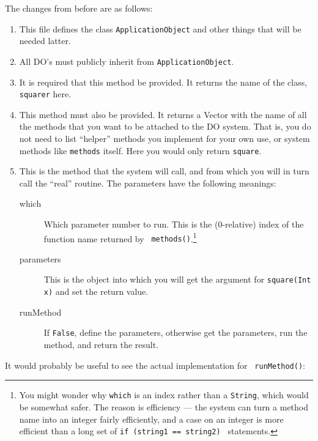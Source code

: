 The changes from before are as follows:
\begin{enumerate}
    \item This file defines the class {\tt ApplicationObject} and
          other things that will be needed latter.
    \item All DO's must publicly inherit from {\tt ApplicationObject}.
    \item It is required that this method be provided. It returns the
          name of the class, {\tt squarer} here.
    \item This method must also be provided. It returns a Vector with
          the name of all the methods that you want to be attached to
          the DO system. That is, you do not need to list
          ``helper'' methods you implement for your own use, or system
          methods like {\tt methods} itself. Here you would only
          return {\tt square}.
    \item This is the method that the system will call, and from which
          you will in turn call the ``real'' routine. The parameters
          have the following meanings:
          \begin{description}

              \item[which] Which parameter number to run. This is the
              (0-relative) index of the function name returned by {\tt
              methods()}.\footnote{You might wonder why {\tt which} is
              an index rather than a {\tt String}, which would be
              somewhat safer. The reason is efficiency --- the system
              can turn a method name into an integer fairly
              efficiently, and a case on an integer is more efficient
              than a long set of {\tt if (string1 == string2) }
              statements.}

              \item[parameters] This is the object into which you will
              get the argument for {\tt square(Int x)} and set the
              return value.

              \item[runMethod] If {\tt False}, define the
              parameters, otherwise get the parameters, run the
              method, and return the result.

          \end{description}
\end{enumerate}

It would probably be useful to see the actual implementation for {\tt
runMethod()}:

